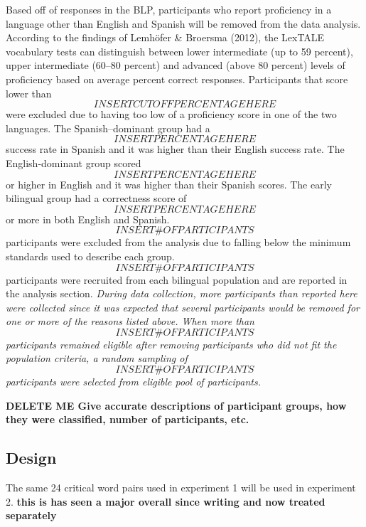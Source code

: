 Based off of responses in the BLP, participants who report proficiency in a language other than English and Spanish will be removed from the data analysis. According to the findings of Lemhöfer \& Broersma (2012), the LexTALE vocabulary tests can distinguish between lower intermediate (up to 59 percent), upper intermediate (60–80 percent) and advanced (above 80 percent) levels of proficiency based on average percent correct responses. Participants that score lower than \[INSERT CUTOFF PERCENTAGE HERE\] were excluded due to having too low of a proficiency score in one of the two languages. The Spanish–dominant group had a  \[INSERT PERCENTAGE HERE\] success rate in Spanish and it was higher than their English success rate. The English-dominant group scored \[INSERT PERCENTAGE HERE\] or higher in English and it was higher than their Spanish scores. The early bilingual group had a correctness score of \[INSERT PERCENTAGE HERE\] or more in both English and Spanish. \[INSERT \# OF PARTICIPANTS\] participants were excluded from the analysis due to falling below the minimum standards used to describe each group. \[INSERT \# OF PARTICIPANTS\]  participants were recruited from each bilingual population and are reported in the analysis section. 
\emph{During data collection, more participants than reported here were collected since it was expected that several participants would be removed for one or more of the reasons listed above. When more than \[INSERT \# OF PARTICIPANTS\] participants remained eligible after removing participants who did not fit the population criteria, a random sampling of \[INSERT \# OF PARTICIPANTS\] participants were selected from eligible pool of participants.}

\textbf{DELETE ME Give accurate descriptions of participant groups, how they were classified, number of participants, etc.}


\subsection{Design}
The same 24 critical word pairs used in experiment 1 will be used in experiment 2. \textbf{this is has seen a major overall since writing and now treated separately}

